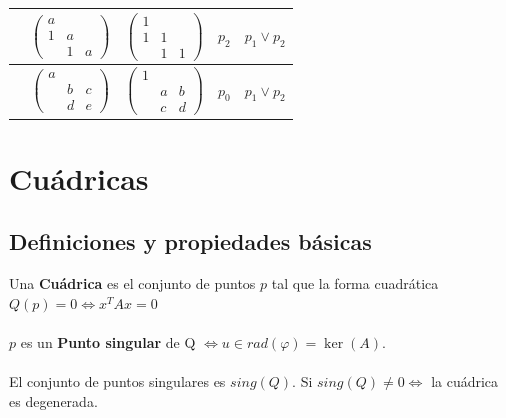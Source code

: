 \documentclass{myclass}
\begin{document}
\begin{center}
\begin{tabular}{|c|c|c|c|c|}
   \hline
					 & $\begin{pmatrix} a & & \\ 1 & a & \\  & 1 & a \end{pmatrix} $ & $\begin{pmatrix} 1 & & \\ 1 & 1 & \\  & 1 & 1 \end{pmatrix} $ & $p_2$ & $p_1\lor p_2$ \\
\hline
					 & $\begin{pmatrix} a & & \\  & b & c\\  & d & e \end{pmatrix} $ & $\begin{pmatrix} 1 & & \\  & a & b\\  & c & d \end{pmatrix} $  & $p_0$ & $p_1\lor p_2$  \\
					 \hline
\end{tabular}
\end{center}





\section{Cuádricas}
\subsection{Definiciones y propiedades básicas}
Una \textbf{Cuádrica} es el conjunto de puntos $p$ tal que la forma cuadrática $Q(p)=0 \iff x^TAx = 0$\\
\\
$p$ es un  \textbf{Punto singular} de Q $\iff u\in rad(\varphi ) = \ker(A)$.\\
\\
El conjunto de puntos singulares es $sing(Q)$. Si $sing(Q)\neq 0 \iff$ la cuádrica es degenerada.
\end{document}
